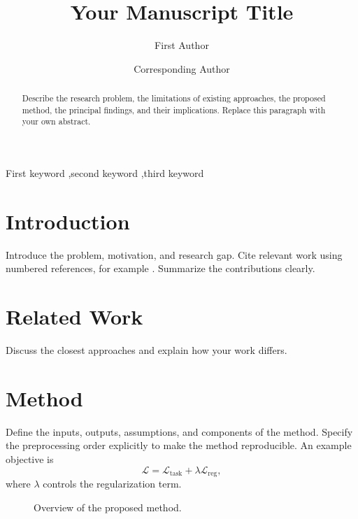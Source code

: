 \documentclass[review,number,sort&compress,nopreprintline]{elsarticle}
\providecommand{\DIFaddtex}[1]{{\protect\color{red}#1}}
\providecommand{\DIFadd}[1]{\texorpdfstring{\DIFaddtex{#1}}{#1}}
\begin{document}
\begin{frontmatter}
\title{Your Manuscript Title}
\author[inst1]{First Author}
\author[inst1]{Corresponding Author\texorpdfstring{}{}}
\begin{abstract}
Describe the research problem, the limitations of existing approaches,
the proposed method, the principal findings, and their implications.
Replace this paragraph with your own abstract.
\end{abstract}
\begin{keyword}
First keyword \sep second keyword \sep third keyword
\end{keyword}
\end{frontmatter}

\section{Introduction}
\linenumbers
\modulolinenumbers[5]
Introduce the problem, motivation, and research gap. Cite relevant work
using numbered references, for example \cite{example-reference}.
Summarize the contributions clearly.

\section{Related Work}
Discuss the closest approaches and explain how your work differs.

\section{Method}
\label{sec:method}
Define the inputs, outputs, assumptions, and components of the method.
\DIFadd{Specify the preprocessing order explicitly to make the method reproducible.}
An example objective is
\begin{equation}
  \mathcal{L}=\mathcal{L}_{\mathrm{task}}+\lambda\mathcal{L}_{\mathrm{reg}},
  \label{eq:loss}
\end{equation}
where $\lambda$ controls the regularization term.

\begin{figure}[t]
  \centering
  \caption{Overview of the proposed method.}
  \label{fig:overview}
\end{figure}
\end{document}
